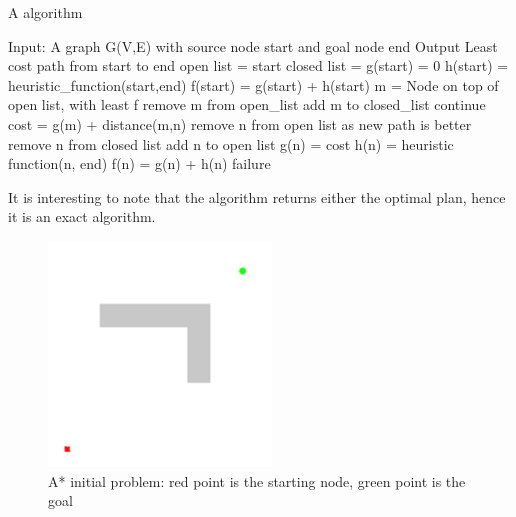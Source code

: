 \begin{algorithm}
\caption{A algorithm}\label{alg:a_star}
\begin{algorithmic}
\STATE Input: A graph G(V,E) with source node start and goal node end
\STATE Output Least cost path from start to end
\STATE open list = {start}
\STATE closed list = {}
\STATE g(start) = 0
\STATE h(start) = heuristic_function(start,end)
\STATE f(start) = g(start) + h(start)
    \STATE m = Node on top of open list, with least f
        \RETURN
    \ENDIF
    \STATE remove m from open_list
    \STATE add m to closed_list
    \STATE continue
    \ENDIF
    \STATE cost = g(m) + distance(m,n)
    \STATE remove n from open list as new path is better
    \ENDIF
    \STATE remove n from closed list
    \ENDIF
    \STATE add n to open list
    \STATE g(n) = cost
    \STATE h(n) = heuristic function(n, end)
    \STATE f(n) = g(n) + h(n)
    \ENDIF
    \ENDFOR
    \ENDWHILE
\RETURN failure
\end{algorithmic}
\end{algorithm}
It is interesting to note that the algorithm returns either the optimal plan, hence it is an exact algorithm.
\begin{figure}[H]
    \centering
    \includegraphics[scale=0.60]{Images/Chapter 4/Aproblem.png}
    \caption{A* initial problem: red point is the starting node, green point is the goal}
    \label{fig:aproblem}
\end{figure}

